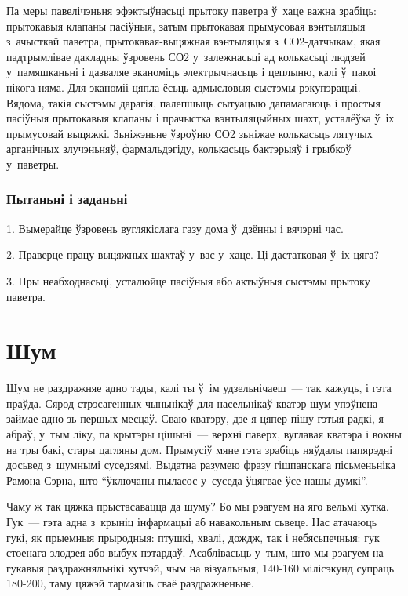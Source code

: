 Па меры павелічэньня эфэктыўнасьці прытоку паветра ў~хаце важна зрабіць: прытокавыя клапаны пасіўныя, затым прытокавая прымусовая вэнтыляцыя з~ачысткай паветра, прытокавая-выцяжная вэнтыляцыя з~СО2-датчыкам, якая падтрымлівае дакладны ўзровень СО2 у~залежнасьці ад колькасьці людзей у~памяшканьні і дазваляе эканоміць электрычнасьць і цеплыню, калі ў~пакоі нікога няма. Для эканоміі цяпла ёсьць адмысловыя сыстэмы рэкупэрацыі. Вядома, такія сыстэмы дарагія, палепшыць сытуацыю дапамагаюць і простыя пасіўныя прытокавыя клапаны і прачыстка вэнтыляцыйных шахт, усталёўка ў~іх прымусовай выцяжкі. Зьніжэньне ўзроўню СО2 зьніжае колькасьць лятучых арганічных злучэньняў, фармальдэгіду, колькасьць бактэрыяў і грыбкоў у~паветры.

\subsubsection{Пытаньні і заданьні}

1. Вымерайце ўзровень вуглякіслага газу дома ў~дзённы і вячэрні час.

2. Праверце працу выцяжных шахтаў у~вас у~хаце. Ці дастатковая ў~іх цяга?

3. Пры неабходнасьці, усталюйце пасіўныя або актыўныя сыстэмы прытоку паветра.


\section{Шум}

Шум не раздражняе адно тады, калі ты ў~ім удзельнічаеш~--- так кажуць, і гэта праўда. Сярод стрэсагенных чыньнікаў для насельнікаў кватэр шум упэўнена займае адно зь першых месцаў. Сваю кватэру, дзе я цяпер пішу гэтыя радкі, я абраў, у~тым ліку, па крытэры цішыні~--- верхні паверх, вуглавая кватэра і вокны на тры бакі, стары цагляны дом. Прымусіў мяне гэта зрабіць няўдалы папярэдні досьвед з~шумнымі суседзямі. Выдатна разумею фразу гішпанскага пісьменьніка Рамона Сэрна, што ``ўключаны пыласос у~суседа ўцягвае ўсе нашы думкі''.

Чаму ж так цяжка прыстасавацца да шуму? Бо мы рэагуем на яго вельмі хутка. Гук~--- гэта адна з~крыніц інфармацыі аб навакольным сьвеце. Нас атачаюць гукі, як прыемныя прыродныя: птушкі, хвалі, дождж, так і небясьпечныя: гук стоенага злодзея або выбух пэтардаў. Асаблівасьць у~тым, што мы рэагуем на гукавыя раздражняльнікі хутчэй, чым на візуальныя, 140-160 мілісэкунд супраць 180-200, таму цяжэй тармазіць сваё раздражненьне.

